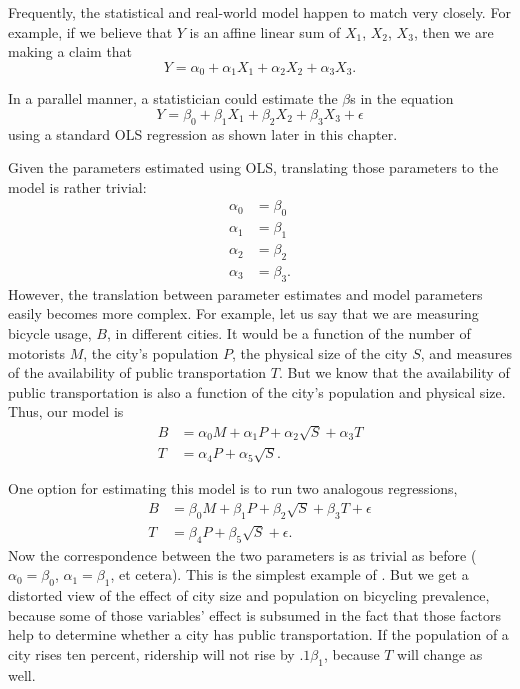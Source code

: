
Frequently, the statistical and real-world model happen to match very closely.
For example, if we believe that $Y$ is an affine linear sum of $X_1$,
$X_2$, $X_3$, then we are making a claim that 
\begin{equation*}
Y = \alpha_0 + \alpha_1 X_1 + \alpha_2 X_2 + \alpha_3 X_3.
\end{equation*}

In a parallel manner, a statistician could estimate the $\beta$s in the equation
\begin{equation*}
Y = \beta_0 + \beta_1 X_1 + \beta_2 X_2 + \beta_3 X_3 + \epsilon
\end{equation*}
using a standard OLS regression as shown later in this chapter.

Given the parameters estimated using OLS, translating those parameters
to the model is rather trivial:
\begin{align*}
\alpha_0 &= \beta_0\\
\alpha_1 &= \beta_1\\
\alpha_2 &= \beta_2\\
\alpha_3 &= \beta_3.
\end{align*}
However, the translation between parameter estimates and model
parameters easily becomes more complex.  For example, let us say that
we are measuring bicycle usage, $B$, in different  cities.  It would be
a function of the number of motorists $M$, the city's population $P$,
the physical size of the city $S$,  and measures of the availability of
public transportation $T$. But we know that the availability of public
transportation is also a function of the city's population and physical
size. Thus, our model is
\begin{align*}
B &= \alpha_0 M + \alpha_1 P + \alpha_2 \sqrt{S} + \alpha_3 T\\
T &= \alpha_4 P + \alpha_5 \sqrt{S}.
\end{align*}

One option for estimating this model is to run two analogous regressions,
\begin{align*}
B &= \beta_0 M + \beta_1 P + \beta_2 \sqrt{S} + \beta_3 T + \epsilon\\
T &= \beta_4 P + \beta_5 \sqrt{S} + \epsilon.
\end{align*}
Now the correspondence between the two parameters is as trivial as
before ($\alpha_0=\beta_0$, $\alpha_1=\beta_1$, et cetera). This is the
simplest example of .
But we get a
distorted view of the effect of city size and population on bicycling
prevalence, because some of those variables' effect is subsumed in the fact that
those factors help to determine whether a city has public
transportation. If the population of a city rises ten percent, ridership
will not rise by $.1 \beta_1$, because $T$ will change as well.

